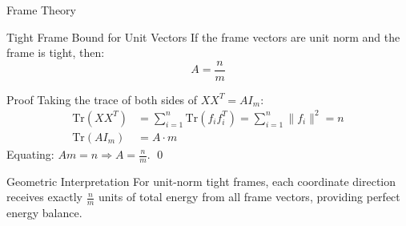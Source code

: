 \documentclass[9pt,dvipsnames]{beamer}
\begin{document}
\begin{frame}{Frame Theory}

	\begin{block}{Tight Frame Bound for Unit Vectors}
		If the frame vectors are unit norm and the frame is tight, then:
		\begin{equation*}
			A = \frac{n}{m}
		\end{equation*}
	\end{block}

	\begin{block}{Proof}
		Taking the trace of both sides of $XX^T = A I_m$:
		\begin{align*}
			\text{Tr}(XX^T) &= \sum_{i=1}^n \text{Tr}(f_i f_i^T) = \sum_{i=1}^n \|f_i\|^2 = n \\
			\text{Tr}(A I_m) &= A \cdot m
		\end{align*}
		Equating: $A m = n \Rightarrow A = \frac{n}{m}$. \qed
	\end{block}

	\begin{block}{Geometric Interpretation}
		For unit-norm tight frames, each coordinate direction receives exactly $\frac{n}{m}$ units of total energy from all frame vectors, providing perfect energy balance.
	\end{block}

\end{frame}
\end{document}
